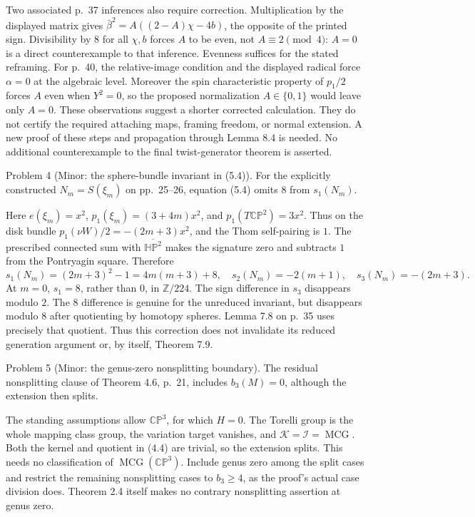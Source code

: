 \documentclass[10pt]{article}
\begin{document}
Two associated p. 37 inferences also require correction. Multiplication by the displayed matrix gives \(\bar\beta^2=A((2-A)\chi-4b)\), the opposite of the printed sign. Divisibility by \(8\) for all \(\chi,b\) forces \(A\) to be even, not \(A\equiv2\pmod4\): \(A=0\) is a direct counterexample to that inference. Evenness suffices for the stated reframing. For p. 40, the relative-image condition and the displayed radical force \(\alpha=0\) at the algebraic level. Moreover the spin characteristic property of \(p_1/2\) forces \(A\) even when \(Y^2=0\), so the proposed normalization \(A\in\{0,1\}\) would leave only \(A=0\). These observations suggest a shorter corrected calculation. They do not certify the required attaching maps, framing freedom, or normal extension. A new proof of these steps and propagation through Lemma 8.4 is needed. No additional counterexample to the final twist-generator theorem is asserted.\par
Problem 4 (Minor: the sphere-bundle invariant in (5.4)).  For the explicitly constructed \(N_m=S(\xi_m)\) on pp. 25–26, equation (5.4) omits \(8\) from \(s_1(N_m)\).\par
Here \(e(\xi_m)=x^2\), \(p_1(\xi_m)=(3+4m)x^2\), and \(p_1(T\mathbb {CP}^2)=3x^2\). Thus on the disk bundle \(p_1(\nu W)/2=-(2m+3)x^2\), and the Thom self-pairing is \(1\). The prescribed connected sum with \(\overline{\mathbb {HP}^2}\) makes the signature zero and subtracts \(1\) from the Pontryagin square. Therefore \[s_1(N_m)=(2m+3)^2-1=4m(m+3)+8,
 \quad s_2(N_m)=-2(m+1),\quad s_3(N_m)=-(2m+3).\] At \(m=0\), \(s_1=8\), rather than \(0\), in \(\mathbb Z/224\). The sign difference in \(s_3\) disappears modulo \(2\). The \(8\) difference is genuine for the unreduced invariant, but disappears modulo \(8\) after quotienting by homotopy spheres. Lemma 7.8 on p. 35 uses precisely that quotient. Thus this correction does not invalidate its reduced generation argument or, by itself, Theorem 7.9.\par
Problem 5 (Minor: the genus-zero nonsplitting boundary).  The residual nonsplitting clause of Theorem 4.6, p. 21, includes \(b_3(M)=0\), although the extension then splits.\par
The standing assumptions allow \(\mathbb {CP}^3\), for which \(H=0\). The Torelli group is the whole mapping class group, the variation target vanishes, and \(\mathcal K=\mathcal I=\operatorname{MCG}\). Both the kernel and quotient in (4.4) are trivial, so the extension splits. This needs no classification of \(\operatorname{MCG}(\mathbb {CP}^3)\). Include genus zero among the split cases and restrict the remaining nonsplitting cases to \(b_3\ge4\), as the proof’s actual case division does. Theorem 2.4 itself makes no contrary nonsplitting assertion at genus zero.\par
\end{document}
